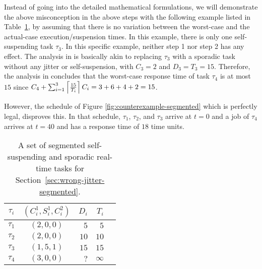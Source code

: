 Instead of going into the detailed mathematical formulations, we will demonstrate the above misconception  in the above steps with the following example listed in Table~\ref{tab:counterexample-segmented}, by assuming that there is no variation between the worst-case and the actual-case execution/suspension times.
In this example, there is only one self-suspending task $\tau_3$. In this specific example,  neither step 1 nor step 2 has any effect. The analysis in \cite{RTCSA-BletsasA05} is basically akin to replacing $\tau_3$ with a sporadic task without any jitter or self-suspension, with $C_3=2$ and $D_3=T_3=15$. Therefore, the analysis in \cite{RTCSA-BletsasA05}  concludes that the worst-case response time of task $\tau_4$ is at most $15$ since $C_4+\sum_{i=1}^{3}\left\lceil{\frac{15}{T_i}}\right\rceil C_i = 3+ 6 + 4 + 2= 15$.


However, the schedule of Figure \ref{fig:counterexample-segmented} which is perfectly legal, disproves this.
In that schedule, $\tau_1$, $\tau_2$, and $\tau_3$ arrive at $t=0$ and a job of $\tau_4$ arrives at $t=40$ and has a response time of 
$18$ time units.

\begin{table}[t]
\begin{center}
\begin{tabular}{|c||c|r|r|r|}
\hline
$\tau_i$ & $(C_i^1, S_i^1, C_i^2)$   &   $D_i$  &     $T_i$     \\ \hline
$\tau_1$ &  $(2, 0, 0)$                    &     $5$  &       $5$     \\ \hline
$\tau_2$ &  $(2, 0, 0)$                    &    $10$  &      $10$     \\ \hline
$\tau_3$ &  $(1, 5, 1)$            &    $15$  &      $15$     \\ \hline
$\tau_4$ &  $(3, 0, 0)$                   &    $?$  &   $\infty$    \\ \hline     
\end{tabular}
\end{center}
\caption{A set of segmented self-suspending and sporadic real-time tasks for Section~\ref{sec:wrong-jitter-segmented}.}
\label{tab:counterexample-segmented}
\end{table}

